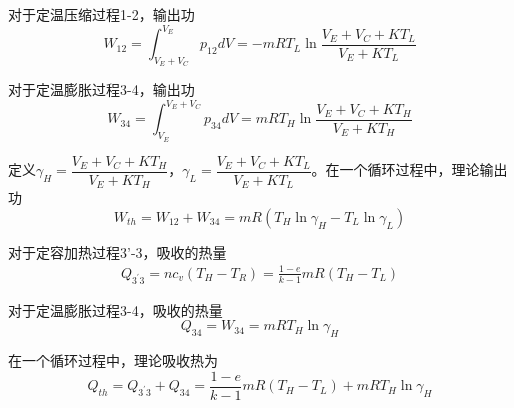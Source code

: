 对于定温压缩过程1-2，输出功
\begin{equation}
	W_{12} = \int^{V_E}_{V_E+V_C}{p_{12}dV}=-mRT_L\ln{\frac{V_E+V_C+KT_L}{V_E+KT_L}}
\end{equation}

对于定温膨胀过程3-4，输出功
\begin{equation}
	W_{34} = \int^{V_E+V_C}_{V_E}{p_{34}dV}=mRT_H\ln{\frac{V_E+V_C+KT_H}{V_E+KT_H}}
\end{equation}

定义$\gamma_H = \dfrac{V_E+V_C+KT_H}{V_E+KT_H}$，$\gamma_L = \dfrac{V_E+V_C+KT_L}{V_E+KT_L}$。在一个循环过程中，理论输出功
\begin{equation}
	W_{th} = W_{12} + W_{34} = mR(T_H\ln\gamma_H - T_L\ln\gamma_L)
\end{equation}

对于定容加热过程3'-3，吸收的热量
\begin{equation}
	\begin{split}
		Q_{3^{'}3} = nc_v(T_H-T_R)
		=\frac{1-e}{k-1}mR(T_H-T_L)
	\end{split}
\end{equation}


对于定温膨胀过程3-4，吸收的热量
\begin{equation}
	Q_{34} = W_{34} = mRT_H\ln\gamma_H
\end{equation}

在一个循环过程中，理论吸收热为
\begin{equation}
	Q_{th} = Q_{3^{'}3} + Q_{34} = \frac{1-e}{k-1}mR(T_H-T_L) + mRT_H\ln\gamma_H
\end{equation}

